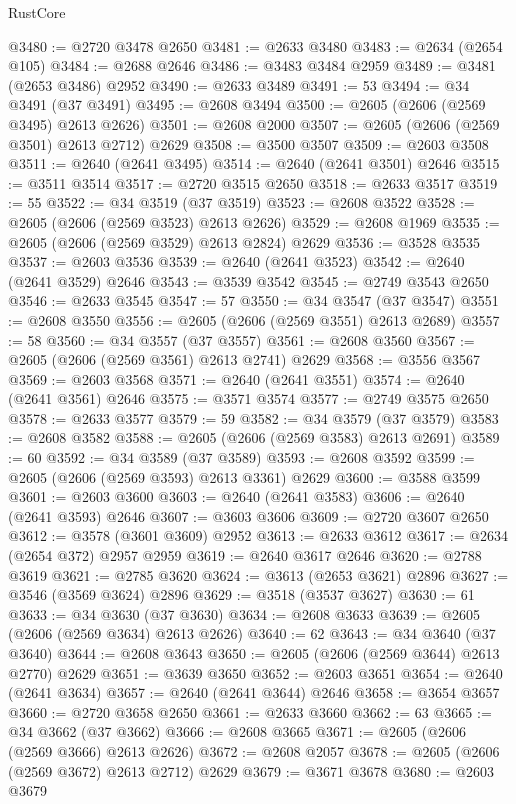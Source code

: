 \begin{lexlean}{RustCore}
\begin{coremodule}
@3480 := @2720 @3478 @2650
@3481 := @2633 @3480
@3483 := @2634 (@2654 @105)
@3484 := @2688 @2646
@3486 := @3483 @3484 @2959
@3489 := @3481 (@2653 @3486) @2952
@3490 := @2633 @3489
@3491 := 53
@3494 := @34 @3491 (@37 @3491)
@3495 := @2608 @3494
@3500 := @2605 (@2606 (@2569 @3495) @2613 @2626)
@3501 := @2608 @2000
@3507 := @2605 (@2606 (@2569 @3501) @2613 @2712) @2629
@3508 := @3500 @3507
@3509 := @2603 @3508
@3511 := @2640 (@2641 @3495)
@3514 := @2640 (@2641 @3501) @2646
@3515 := @3511 @3514
@3517 := @2720 @3515 @2650
@3518 := @2633 @3517
@3519 := 55
@3522 := @34 @3519 (@37 @3519)
@3523 := @2608 @3522
@3528 := @2605 (@2606 (@2569 @3523) @2613 @2626)
@3529 := @2608 @1969
@3535 := @2605 (@2606 (@2569 @3529) @2613 @2824) @2629
@3536 := @3528 @3535
@3537 := @2603 @3536
@3539 := @2640 (@2641 @3523)
@3542 := @2640 (@2641 @3529) @2646
@3543 := @3539 @3542
@3545 := @2749 @3543 @2650
@3546 := @2633 @3545
@3547 := 57
@3550 := @34 @3547 (@37 @3547)
@3551 := @2608 @3550
@3556 := @2605 (@2606 (@2569 @3551) @2613 @2689)
@3557 := 58
@3560 := @34 @3557 (@37 @3557)
@3561 := @2608 @3560
@3567 := @2605 (@2606 (@2569 @3561) @2613 @2741) @2629
@3568 := @3556 @3567
@3569 := @2603 @3568
@3571 := @2640 (@2641 @3551)
@3574 := @2640 (@2641 @3561) @2646
@3575 := @3571 @3574
@3577 := @2749 @3575 @2650
@3578 := @2633 @3577
@3579 := 59
@3582 := @34 @3579 (@37 @3579)
@3583 := @2608 @3582
@3588 := @2605 (@2606 (@2569 @3583) @2613 @2691)
@3589 := 60
@3592 := @34 @3589 (@37 @3589)
@3593 := @2608 @3592
@3599 := @2605 (@2606 (@2569 @3593) @2613 @3361) @2629
@3600 := @3588 @3599
@3601 := @2603 @3600
@3603 := @2640 (@2641 @3583)
@3606 := @2640 (@2641 @3593) @2646
@3607 := @3603 @3606
@3609 := @2720 @3607 @2650
@3612 := @3578 (@3601 @3609) @2952
@3613 := @2633 @3612
@3617 := @2634 (@2654 @372) @2957 @2959
@3619 := @2640 @3617 @2646
@3620 := @2788 @3619
@3621 := @2785 @3620
@3624 := @3613 (@2653 @3621) @2896
@3627 := @3546 (@3569 @3624) @2896
@3629 := @3518 (@3537 @3627)
@3630 := 61
@3633 := @34 @3630 (@37 @3630)
@3634 := @2608 @3633
@3639 := @2605 (@2606 (@2569 @3634) @2613 @2626)
@3640 := 62
@3643 := @34 @3640 (@37 @3640)
@3644 := @2608 @3643
@3650 := @2605 (@2606 (@2569 @3644) @2613 @2770) @2629
@3651 := @3639 @3650
@3652 := @2603 @3651
@3654 := @2640 (@2641 @3634)
@3657 := @2640 (@2641 @3644) @2646
@3658 := @3654 @3657
@3660 := @2720 @3658 @2650
@3661 := @2633 @3660
@3662 := 63
@3665 := @34 @3662 (@37 @3662)
@3666 := @2608 @3665
@3671 := @2605 (@2606 (@2569 @3666) @2613 @2626)
@3672 := @2608 @2057
@3678 := @2605 (@2606 (@2569 @3672) @2613 @2712) @2629
@3679 := @3671 @3678
@3680 := @2603 @3679

\end{coremodule}
\end{lexlean}
